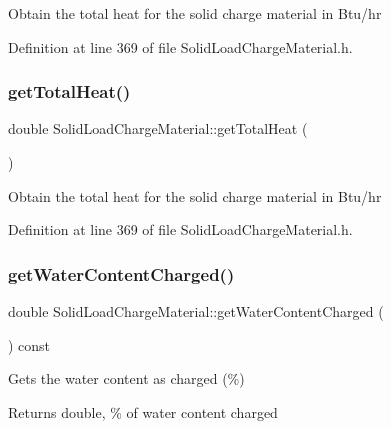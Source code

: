 Obtain the total heat for the solid charge material in Btu/hr 

Definition at line 369 of file Solid\+Load\+Charge\+Material.\+h.

\mbox{\label{class_solid_load_charge_material_af8593eb758c64236a8a026d6145584f4}} 
\subsubsection{\texorpdfstring{get\+Total\+Heat()}{getTotalHeat()}\hspace{0.1cm}{\footnotesize\ttfamily [3/3]}}
{\footnotesize\ttfamily double Solid\+Load\+Charge\+Material\+::get\+Total\+Heat (\begin{DoxyParamCaption}{ }\end{DoxyParamCaption})\hspace{0.3cm}{\ttfamily [inline]}}

Obtain the total heat for the solid charge material in Btu/hr 

Definition at line 369 of file Solid\+Load\+Charge\+Material.\+h.

\mbox{\label{class_solid_load_charge_material_a2f99a8553d12b45bad53acc14338199a}} 
\subsubsection{\texorpdfstring{get\+Water\+Content\+Charged()}{getWaterContentCharged()}\hspace{0.1cm}{\footnotesize\ttfamily [1/3]}}
{\footnotesize\ttfamily double Solid\+Load\+Charge\+Material\+::get\+Water\+Content\+Charged (\begin{DoxyParamCaption}{ }\end{DoxyParamCaption}) const\hspace{0.3cm}{\ttfamily [inline]}}

Gets the water content as charged (\%) \begin{DoxyReturn}{Returns}
double, \% of water content charged 
\end{DoxyReturn}


